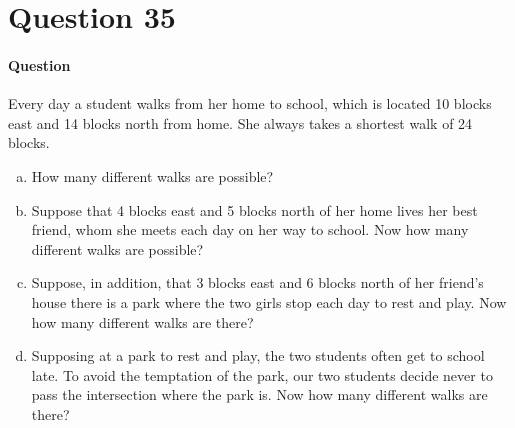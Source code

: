 \documentclass[UTF8]{article}
\begin{document}
\section{Question 35}
\paragraph{Question}
Every day a student walks from her home to school, which is located 10 blocks east and 14 blocks north from home. She always takes a shortest walk of 24 blocks.
\begin{enumerate}[(a)]
    \item How many different walks are possible?
    \item Suppose that 4 blocks east and 5 blocks north of her home lives her best
    friend, whom she meets each day on her way to school. Now how many
    different walks are possible?
    \item Suppose, in addition, that 3 blocks east and 6 blocks north of her friend’s
    house there is a park where the two girls stop each day to rest and play. Now
    how many different walks are there?
    \item Supposing at a park to rest and play, the two students often get to school late.
    To avoid the temptation of the park, our two students decide never to pass
    the intersection where the park is. Now how many different walks are there?
\end{enumerate}
\end{document}
